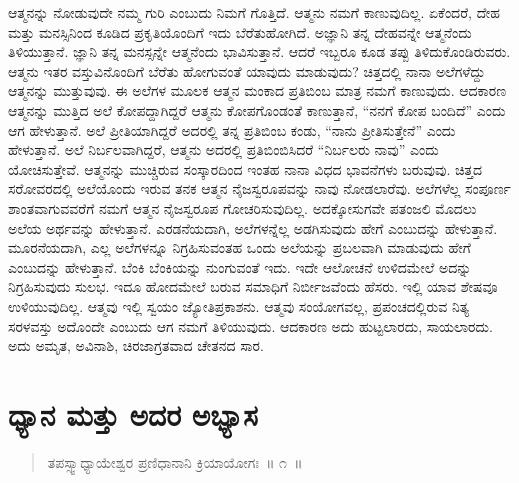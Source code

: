 ಆತ್ಮನನ್ನು ನೋಡುವುದೇ ನಮ್ಮ ಗುರಿ ಎಂಬುದು ನಿಮಗೆ ಗೊತ್ತಿದೆ. ಆತ್ಮನು ನಮಗೆ ಕಾಣುವುದಿಲ್ಲ. ಏಕೆಂದರೆ, ದೇಹ ಮತ್ತು ಮನಸ್ಸಿನಿಂದ ಕೂಡಿದ ಪ್ರಕೃತಿಯೊಂದಿಗೆ ಇದು ಬೆರೆತುಹೋಗಿದೆ. ಅಜ್ಞಾನಿ ತನ್ನ ದೇಹವನ್ನೇ ಆತ್ಮನೆಂದು ತಿಳಿಯುತ್ತಾನೆ. ಜ್ಞಾನಿ ತನ್ನ ಮನಸ್ಸನ್ನೇ ಆತ್ಮನೆಂದು ಭಾವಿಸುತ್ತಾನೆ. ಆದರೆ ಇಬ್ಬರೂ ಕೂಡ ತಪ್ಪು ತಿಳಿದುಕೊಂಡಿರುವರು. ಆತ್ಮನು ಇತರ ವಸ್ತುವಿನೊಂದಿಗೆ ಬೆರೆತು ಹೋಗುವಂತೆ ಯಾವುದು ಮಾಡುವುದು? ಚಿತ್ತದಲ್ಲಿ ನಾನಾ ಅಲೆಗಳೆದ್ದು ಆತ್ಮನನ್ನು ಮುತ್ತುವುವು. ಈ ಅಲೆಗಳ ಮೂಲಕ ಆತ್ಮನ ಮಂಕಾದ ಪ್ರತಿಬಿಂಬ ಮಾತ್ರ ನಮಗೆ ಕಾಣುವುದು. ಆದಕಾರಣ ಆತ್ಮನನ್ನು ಮುತ್ತಿದ ಅಲೆ ಕೋಪದ್ದಾಗಿದ್ದರೆ ಆತ್ಮನು ಕೋಪಗೊಂಡಂತೆ ಕಾಣುತ್ತಾನೆ, “ನನಗೆ ಕೋಪ ಬಂದಿದೆ” ಎಂದು ಆಗ ಹೇಳುತ್ತಾನೆ. ಅಲೆ ಪ್ರೀತಿಯಾಗಿದ್ದರೆ ಅದರಲ್ಲಿ ತನ್ನ ಪ್ರತಿಬಿಂಬ ಕಂಡು, “ನಾನು ಪ್ರೀತಿಸುತ್ತೇನೆ” ಎಂದು ಹೇಳುತ್ತಾನೆ. ಅಲೆ ನಿರ್ಬಲವಾಗಿದ್ದರೆ, ಆತ್ಮನು ಅದರಲ್ಲಿ ಪ್ರತಿಬಿಂಬಿಸಿದರೆ “ನಿರ್ಬಲರು ನಾವು” ಎಂದು ಯೋಚಿಸುತ್ತೇವೆ. ಆತ್ಮನನ್ನು ಮುಚ್ಚಿರುವ ಸಂಸ್ಕಾರದಿಂದ ಇಂತಹ ನಾನಾ ವಿಧದ ಭಾವನೆಗಳು ಬರುವುವು. ಚಿತ್ತದ ಸರೋವರದಲ್ಲಿ ಅಲೆಯೊಂದು ಇರುವ ತನಕ ಆತ್ಮನ ನೈಜಸ್ವರೂಪವನ್ನು ನಾವು ನೋಡಲಾರೆವು. ಅಲೆಗಳೆಲ್ಲ ಸಂಪೂರ್ಣ ಶಾಂತವಾಗುವವರೆಗೆ ನಮಗೆ ಆತ್ಮನ ನೈಜಸ್ವರೂಪ ಗೋಚರಿಸುವುದಿಲ್ಲ. ಅದಕ್ಕೋಸುಗವೇ ಪತಂಜಲಿ ಮೊದಲು ಅಲೆಯ ಅರ್ಥವನ್ನು ಹೇಳುತ್ತಾನೆ. ಎರಡನೆಯದಾಗಿ, ಅಲೆಗಳನ್ನೆಲ್ಲ ಅಡಗಿಸುವುದು ಹೇಗೆ ಎಂಬುದನ್ನು ಹೇಳುತ್ತಾನೆ. ಮೂರನೆಯದಾಗಿ, ಎಲ್ಲ ಅಲೆಗಳನ್ನೂ ನಿಗ್ರಹಿಸುವಂತಹ ಒಂದು ಅಲೆಯನ್ನು ಪ್ರಬಲವಾಗಿ ಮಾಡುವುದು ಹೇಗೆ ಎಂಬುದನ್ನು ಹೇಳುತ್ತಾನೆ. ಬೆಂಕಿ ಬೆಂಕಿಯನ್ನು ನುಂಗುವಂತೆ ಇದು. ಇದೇ ಆಲೋಚನೆ ಉಳಿದಮೇಲೆ ಅದನ್ನು ನಿಗ್ರಹಿಸುವುದು ಸುಲಭ. ಇದೂ ಹೋದಮೇಲೆ ಬರುವ ಸಮಾಧಿಗೆ ನಿರ್ಬೀಜವೆಂದು ಹೆಸರು. ಇಲ್ಲಿ ಯಾವ ಶೇಷವೂ ಉಳಿಯುವುದಿಲ್ಲ. ಆತ್ಮವು ಇಲ್ಲಿ ಸ್ವಯಂ ಜ್ಯೋತಿಪ್ರಕಾಶನು. ಆತ್ಮವು ಸಂಯೋಗವಲ್ಲ, ಪ್ರಪಂಚದಲ್ಲಿರುವ ನಿತ್ಯ ಸರಳವಸ್ತು ಅದೊಂದೇ ಎಂಬುದು ಆಗ ನಮಗೆ ತಿಳಿಯುವುದು. ಆದಕಾರಣ ಅದು ಹುಟ್ಟಲಾರದು, ಸಾಯಲಾರದು. ಅದು ಅಮೃತ, ಅವಿನಾಶಿ, ಚಿರಜಾಗ್ರತವಾದ ಚೇತನದ ಸಾರ.

\chapter{ಧ್ಯಾನ ಮತ್ತು ಅದರ ಅಭ್ಯಾಸ}%

\begin{verse}
ತಪಸ್ಸ್ವಾಧ್ಯಾಯೇಶ್ವರ ಪ್ರಣಿಧಾನಾನಿ ಕ್ರಿಯಾಯೋಗಃ~॥ ೧~॥
\end{verse}

\vspace{-0.3cm}


